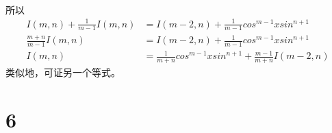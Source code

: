 \documentclass{article}
\begin{document}
\begin{itemize}
\begin{align*}
        \end{align*}
        所以
        \begin{align*}
          I(m, n) + \frac{1}{m - 1} I(m, n) & = I(m - 2, n) + \frac{1}{m - 1} cos^{m - 1} x sin^{n + 1}                     \\
          \frac{m + n}{m - 1} I(m, n)       & = I(m - 2, n) + \frac{1}{m - 1} cos^{m - 1} x sin^{n + 1}                     \\
          I(m, n)                           & = \frac{1}{m + n} cos^{m - 1} x sin^{n + 1} + \frac{m - 1}{m + n} I(m - 2, n)
        \end{align*}
        类似地，可证另一个等式。
\end{itemize}

\section*{6}
\end{document}
